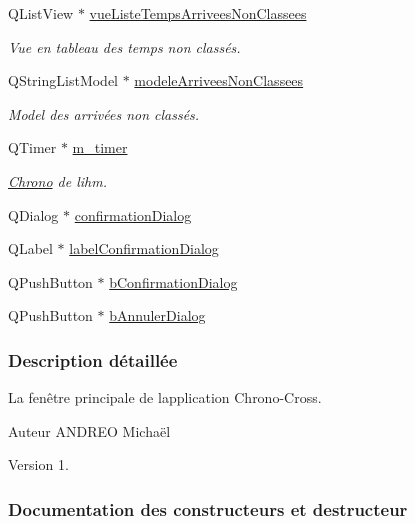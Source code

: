 \begin{DoxyCompactItemize}
Q\+List\+View $\ast$ \hyperlink{class_i_h_m_chrono_cross_aaf04338d882f708e57d9872b1c82b7a0}{vue\+Liste\+Temps\+Arrivees\+Non\+Classees}
\begin{DoxyCompactList}\small\item\em Vue en tableau des temps non classés. \end{DoxyCompactList}\item 
Q\+String\+List\+Model $\ast$ \hyperlink{class_i_h_m_chrono_cross_a12a210c6a93f70df764841b7d322b05c}{modele\+Arrivees\+Non\+Classees}
\begin{DoxyCompactList}\small\item\em Model des arrivées non classés. \end{DoxyCompactList}\item 
Q\+Timer $\ast$ \hyperlink{class_i_h_m_chrono_cross_ad29ebde513a6e722cf87aa06e767416a}{m\+\_\+timer}
\begin{DoxyCompactList}\small\item\em \hyperlink{class_chrono}{Chrono} de l\textquotesingle{}ihm. \end{DoxyCompactList}\item 
Q\+Dialog $\ast$ \hyperlink{class_i_h_m_chrono_cross_ad7fc4afa5689501063cc207a8daf5752}{confirmation\+Dialog}
\item 
Q\+Label $\ast$ \hyperlink{class_i_h_m_chrono_cross_a20522f998469b4b34b8939dce6b239b3}{label\+Confirmation\+Dialog}
\item 
Q\+Push\+Button $\ast$ \hyperlink{class_i_h_m_chrono_cross_a57bb61d8175dc09f0497ee3834cb6ad5}{b\+Confirmation\+Dialog}
\item 
Q\+Push\+Button $\ast$ \hyperlink{class_i_h_m_chrono_cross_a7d2639da4d7d7afae5d2a66e83695a4e}{b\+Annuler\+Dialog}
\end{DoxyCompactItemize}


\subsubsection{Description détaillée}
La fenêtre principale de l\textquotesingle{}application Chrono-\/\+Cross. 

\begin{DoxyAuthor}{Auteur}
A\+N\+D\+R\+EO Michaël 
\end{DoxyAuthor}
\begin{DoxyVersion}{Version}
1. 
\end{DoxyVersion}


\subsubsection{Documentation des constructeurs et destructeur}
\mbox{\label{class_i_h_m_chrono_cross_a479fc90733fba3e65fb06aa4a3adc02e}} 
